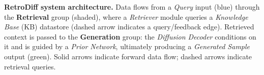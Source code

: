 \caption{\textbf{RetroDiff system architecture.} Data flows from a \textit{Query} input (blue) through the \textbf{Retrieval} group (shaded), where a \textit{Retriever} module queries a \textit{Knowledge Base} (KB) datastore (dashed arrow indicates a query/feedback edge). Retrieved context is passed to the \textbf{Generation} group: the \textit{Diffusion Decoder} conditions on it and is guided by a \textit{Prior Network}, ultimately producing a \textit{Generated Sample} output (green). Solid arrows indicate forward data flow; dashed arrows indicate retrieval queries.}
